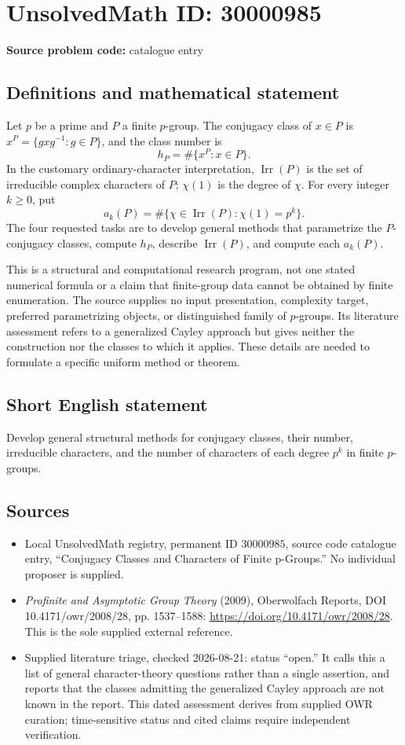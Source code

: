 \documentclass[11pt]{article}
\begin{document}
\section*{UnsolvedMath ID: 30000985}
\textbf{Source problem code:} catalogue entry
\subsection{Definitions and mathematical statement}
Let \(p\) be a prime and \(P\) a finite \(p\)-group. The conjugacy class of \(x\in P\) is \(x^P=\{g xg^{-1}:g\in P\}\), and the class number is
\[
h_P=\#\{x^P:x\in P\}.
\]
In the customary ordinary-character interpretation, \(\operatorname{Irr}(P)\) is the set of irreducible complex characters of \(P\); \(\chi(1)\) is the degree of \(\chi\). For every integer \(k\geq0\), put
\[
a_k(P)=\#\{\chi\in\operatorname{Irr}(P):\chi(1)=p^k\}.
\]
The four requested tasks are to develop general methods that parametrize the \(P\)-conjugacy classes, compute \(h_P\), describe \(\operatorname{Irr}(P)\), and compute each \(a_k(P)\).

This is a structural and computational research program, not one stated numerical formula or a claim that finite-group data cannot be obtained by finite enumeration. The source supplies no input presentation, complexity target, preferred parametrizing objects, or distinguished family of \(p\)-groups. Its literature assessment refers to a generalized Cayley approach but gives neither the construction nor the classes to which it applies. These details are needed to formulate a specific uniform method or theorem.
\subsection{Short English statement}
Develop general structural methods for conjugacy classes, their number, irreducible characters, and the number of characters of each degree \(p^k\) in finite \(p\)-groups.
\subsection{Sources}
\begin{itemize}
\item Local UnsolvedMath registry, permanent ID \(30000985\), source code catalogue entry, ``Conjugacy Classes and Characters of Finite p-Groups.'' No individual proposer is supplied.
\item \emph{Profinite and Asymptotic Group Theory} (2009), Oberwolfach Reports, DOI 10.4171/owr/2008/28, pp. 1537--1588: \url{https://doi.org/10.4171/owr/2008/28}. This is the sole supplied external reference.
\item Supplied literature triage, checked 2026-08-21: status ``open.'' It calls this a list of general character-theory questions rather than a single assertion, and reports that the classes admitting the generalized Cayley approach are not known in the report. This dated assessment derives from supplied OWR curation; time-sensitive status and cited claims require independent verification.
\end{itemize}
\end{document}

